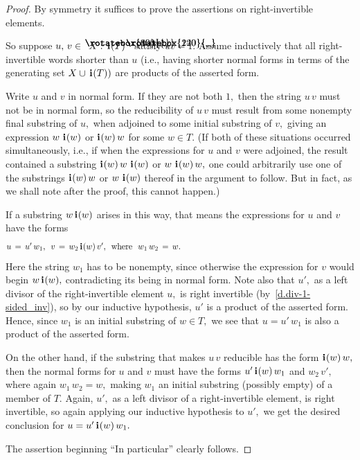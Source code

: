 \documentclass{amsart}
\numberwithin{equation}{section}
\newcommand{\I}{\mathbf{i}\hspace{.05em}}
\newcommand{\langl}{\begin{picture}(.51em,1em)
\put(.11em,.33em){\rotatebox{60}{\line(1,0){.55em}}}
\put(.11em,.33em){\rotatebox{300}{\line(1,0){.55em}}}
\end{picture}}
\newcommand{\rangl}{\begin{picture}(.5em,1em)
\put(.09em,.33em){\rotatebox{120}{\line(1,0){.55em}}}
\put(.09em,.33em){\rotatebox{240}{\line(1,0){.55em}}}
\end{picture}}
\begin{document}
\begin{proof}
By symmetry it suffices to prove the assertions
on right-invertible elements.

So suppose $u,\,v\in \langl X:\,\I(T)\rangl$ satisfy $uv=1.$
Assume inductively that all right-invertible words
shorter than $u$ (i.e., having shorter normal
forms in terms of the generating set $X\cup\,\I(T))$
are products of the asserted form.

Write $u$ and $v$ in normal form.
If they are not both $1,$ then the string $u\,v$ must
not be in normal form, so the reducibility of $u\,v$ must result
from some nonempty final substring of $u,$ when adjoined
to some initial substring of $v,$ giving an expression $w\,\,\I(w)$
or $\I(w)\,w$ for some $w\in T.$
(If both of these situations occurred
simultaneously, i.e., if when the expressions
for $u$ and $v$ were adjoined, the result contained
a substring $\I(w)\,w\,\,\I(w)$ or $w\,\,\I(w)\,w,$
one could arbitrarily use one of the substrings
$\I(w)\,w$ or $w\,\,\I(w)$ thereof in the argument to follow.
But in fact, as we shall note after the proof, this cannot happen.)

If a substring $w\,\I(w)$ arises in this way, that
means the expressions for $u$ and $v$ have the forms
%
\begin{equation}\begin{minipage}[c]{35pc}\label{d.u=,v=}
$u\,=\,u'\,w_1,$ \ $v\,=\,w_2\,\I(w)\,v',$ \ where \ $w_1\,w_2\,=\,w.$
\end{minipage}\end{equation}
%
Here the string $w_1$ has to be nonempty, since otherwise the
expression for $v$ would begin $w\,\I(w),$ contradicting its
being in normal form.
Note also that $u',$ as a left divisor of the right-invertible
element $u,$ is right invertible (by~\eqref{d.div-1-sided_inv}), so
by our inductive hypothesis, $u'$ is a product of the asserted form.
Hence, since $w_1$ is an initial substring of $w\in T,$
we see that $u=u'\,w_1$ is also a product of the asserted form.

On the other hand, if the substring that makes $u\,v$ reducible
has the form $\I(w)\,w,$ then the normal forms for $u$ and $v$
must have the forms $u'\,\I(w)\,w_1$ and $w_2\,v',$ where
again $w_1\,w_2=w,$ making $w_1$ an initial substring
(possibly empty) of a member of $T.$
Again, $u',$ as a left divisor of a right-invertible
element, is right invertible, so
again applying our inductive hypothesis to $u',$
we get the desired conclusion for $u=u'\,\I(w)\,w_1.$

The assertion beginning ``In particular'' clearly follows.
\end{proof}
\end{document}
